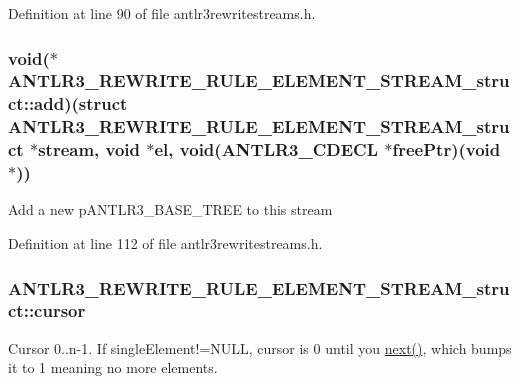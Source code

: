 Definition at line 90 of file antlr3rewritestreams.\-h.

\hypertarget{struct_a_n_t_l_r3___r_e_w_r_i_t_e___r_u_l_e___e_l_e_m_e_n_t___s_t_r_e_a_m__struct_a40c0438d249bc834876cdeba57e5c36f}{
\subsubsection[{add}]{\setlength{\rightskip}{0pt plus 5cm}void($\ast$ A\-N\-T\-L\-R3\-\_\-\-R\-E\-W\-R\-I\-T\-E\-\_\-\-R\-U\-L\-E\-\_\-\-E\-L\-E\-M\-E\-N\-T\-\_\-\-S\-T\-R\-E\-A\-M\-\_\-struct\-::add)(struct {\bf A\-N\-T\-L\-R3\-\_\-\-R\-E\-W\-R\-I\-T\-E\-\_\-\-R\-U\-L\-E\-\_\-\-E\-L\-E\-M\-E\-N\-T\-\_\-\-S\-T\-R\-E\-A\-M\-\_\-struct} $\ast$stream, void $\ast$el, void({\bf A\-N\-T\-L\-R3\-\_\-\-C\-D\-E\-C\-L} $\ast$free\-Ptr)(void $\ast$))}}\label{struct_a_n_t_l_r3___r_e_w_r_i_t_e___r_u_l_e___e_l_e_m_e_n_t___s_t_r_e_a_m__struct_a40c0438d249bc834876cdeba57e5c36f}
Add a new p\-A\-N\-T\-L\-R3\-\_\-\-B\-A\-S\-E\-\_\-\-T\-R\-E\-E to this stream 

Definition at line 112 of file antlr3rewritestreams.\-h.

\hypertarget{struct_a_n_t_l_r3___r_e_w_r_i_t_e___r_u_l_e___e_l_e_m_e_n_t___s_t_r_e_a_m__struct_a26ee5204e3a6fa6ba468478663a46f60}{
\subsubsection[{cursor}]{ A\-N\-T\-L\-R3\-\_\-\-R\-E\-W\-R\-I\-T\-E\-\_\-\-R\-U\-L\-E\-\_\-\-E\-L\-E\-M\-E\-N\-T\-\_\-\-S\-T\-R\-E\-A\-M\-\_\-struct\-::cursor}}\label{struct_a_n_t_l_r3___r_e_w_r_i_t_e___r_u_l_e___e_l_e_m_e_n_t___s_t_r_e_a_m__struct_a26ee5204e3a6fa6ba468478663a46f60}
Cursor 0..n-\/1. If single\-Element!=N\-U\-L\-L, cursor is 0 until you \hyperlink{struct_a_n_t_l_r3___r_e_w_r_i_t_e___r_u_l_e___e_l_e_m_e_n_t___s_t_r_e_a_m__struct_a49a3d89cea69ba728843b12a5cfd51e3}{next()}, which bumps it to 1 meaning no more elements. 

